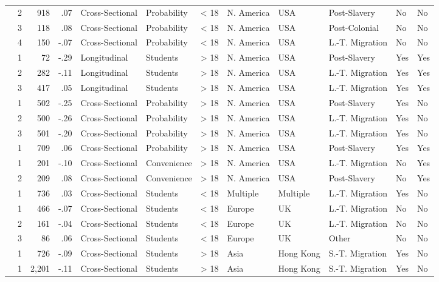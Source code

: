 \documentclass[10pt, letterpaper]{article}
\begin{document}
\begin{landscape}
\begin{xltabular}{650pt}{Xrrrllrlllll}
 & 2 & 918 & .07 & Cross-Sectional & Probability & < 18 & N. America & USA & Post-Slavery & No & No\\
 & 3 & 118 & .08 & Cross-Sectional & Probability & < 18 & N. America & USA & Post-Colonial & No & No\\
 & 4 & 150 & -.07 & Cross-Sectional & Probability & < 18 & N. America & USA & L.-T. Migration & No & No\\
\cite{1743} & 1 & 72 & -.29 & Longitudinal & Students & > 18 & N. America & USA & Post-Slavery & Yes & Yes\\
 & 2 & 282 & -.11 & Longitudinal & Students & > 18 & N. America & USA & L.-T. Migration & Yes & Yes\\
 & 3 & 417 & .05 & Longitudinal & Students & > 18 & N. America & USA & L.-T. Migration & Yes & Yes\\
\cite{1658} & 1 & 502 & -.25 & Cross-Sectional & Probability & > 18 & N. America & USA & Post-Slavery & Yes & No\\
 & 2 & 500 & -.26 & Cross-Sectional & Probability & > 18 & N. America & USA & L.-T. Migration & Yes & No\\
 & 3 & 501 & -.20 & Cross-Sectional & Probability & > 18 & N. America & USA & L.-T. Migration & Yes & No\\
\cite{933} & 1 & 709 & .06 & Cross-Sectional & Probability & > 18 & N. America & USA & Post-Slavery & Yes & Yes\\
\cite{2394} & 1 & 201 & -.10 & Cross-Sectional & Convenience & > 18 & N. America & USA & L.-T. Migration & No & Yes\\
 & 2 & 209 & .08 & Cross-Sectional & Convenience & > 18 & N. America & USA & Post-Slavery & No & Yes\\
\cite{829} & 1 & 736 & .03 & Cross-Sectional & Students & < 18 & Multiple & Multiple & L.-T. Migration & Yes & No\\
\cite{2383} & 1 & 466 & -.07 & Cross-Sectional & Students & < 18 & Europe & UK & L.-T. Migration & No & No\\
 & 2 & 161 & -.04 & Cross-Sectional & Students & < 18 & Europe & UK & L.-T. Migration & No & No\\
 & 3 & 86 & .06 & Cross-Sectional & Students & < 18 & Europe & UK & Other & No & No\\
\cite{1395} & 1 & 726 & -.09 & Cross-Sectional & Students & > 18 & Asia & Hong Kong & S.-T. Migration & Yes & No\\
\cite{3000} & 1 & 2,201 & -.11 & Cross-Sectional & Students & > 18 & Asia & Hong Kong & S.-T. Migration & Yes & No\\


\end{xltabular}
\end{landscape}
\end{document}
